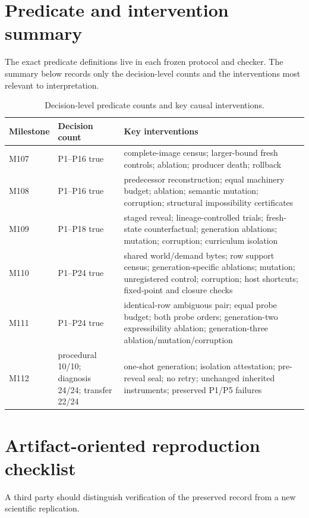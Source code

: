 \section{Predicate and intervention summary}
\label{app:predicates}
The exact predicate definitions live in each frozen protocol and checker. The summary below records only the decision-level counts and the interventions most relevant to interpretation.

\begin{table}[H]
\centering
\small
\caption{Decision-level predicate counts and key causal interventions.}
\begin{tabularx}{\textwidth}{@{}l l X@{}}
\toprule
Milestone & Decision count & Key interventions \\
\midrule
M107 & P1--P16 true & complete-image census; larger-bound fresh controls; ablation; producer death; rollback \\
M108 & P1--P16 true & predecessor reconstruction; equal machinery budget; ablation; semantic mutation; corruption; structural impossibility certificates \\
M109 & P1--P18 true & staged reveal; lineage-controlled trials; fresh-state counterfactual; generation ablations; mutation; corruption; curriculum isolation \\
M110 & P1--P24 true & shared world/demand bytes; row support census; generation-specific ablations; mutation; unregistered control; corruption; host shortcuts; fixed-point and closure checks \\
M111 & P1--P24 true & identical-row ambiguous pair; equal probe budget; both probe orders; generation-two expressibility ablation; generation-three ablation/mutation/corruption \\
M112 & procedural 10/10; diagnosis 24/24; transfer 22/24 & one-shot generation; isolation attestation; pre-reveal seal; no retry; unchanged inherited instruments; preserved P1/P5 failures \\
\bottomrule
\end{tabularx}
\end{table}

\section{Artifact-oriented reproduction checklist}
\label{app:repro}
A third party should distinguish verification of the preserved record from a new scientific replication.


